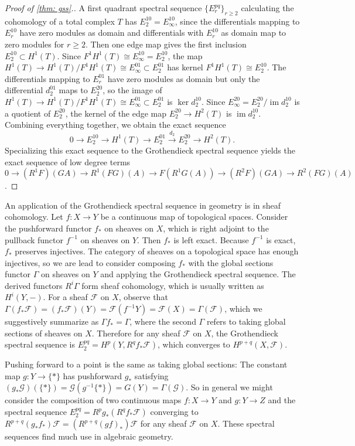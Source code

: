 \documentclass[11pt,leqno]{article}
\theoremstyle{plain}
\theoremstyle{definition}
\numberwithin{equation}{section}
\numberwithin{lem}{section}
\DeclareMathOperator{\im}{im}
\begin{document}
\begin{proof}[Proof of \cref{thm: gss}.]
  A first quadrant spectral sequence $\{E_r^{pq}\}_{r\geq 2}$ calculating the cohomology of a total complex $T$ has $E_2^{10} = E_\infty^{10}$, since the differentials mapping to $E_r^{10}$ have zero modules as domain and differentials with $E_r^{10}$ as domain map to zero modules for $r\geq 2$. Then one edge map gives the first inclusion $E_2^{10}\subset H^1(T)$. Since $F^1H^1(T)\cong E_\infty^{10} = E_2^{10}$, the map $H^1(T)\to H^1(T)/F^1H^1(T)\cong E_\infty^{01}\subset E_2^{01}$ has kernel $F^1H^1(T) \cong E_2^{10}$. The differentials mapping to $E_r^{01}$ have zero modules as domain but only the differential $d_2^{01}$ maps to $E_2^{20}$, so the image of $H^1(T)\to H^1(T)/F^1H^1(T)\cong E_\infty^{01}\subset E_2^{01}$ is $\ker d_2^{10}$. Since $E_\infty^{20} = E_2^{20}/\im d_2^{10}$ is a quotient of $E_2^{20}$, the kernel of the edge map $E_2^{20}\to H^2(T)$ is $\im d_2^{10}$. Combining everything together, we obtain the exact sequence 
  \[0\to E_2^{10}\to H^1(T)\to E_2^{01}\xrightarrow{d_2}E_2^{20}\to H^2(T).\]
  Specializing this exact sequence to the Grothendieck spectral sequence yields the exact sequence of low degree terms $0\to (R^1F)(GA)\to R^1(FG)(A)\to F(R^1G(A))\to (R^2F)(GA)\to R^2(FG)(A)$.
\end{proof} 

An application of the Grothendieck spectral sequence in geometry is in sheaf cohomology. Let $f\colon X\to Y$ be a continuous map of topological spaces. Consider the pushforward functor $f_\ast$ on sheaves on $X$, which is right adjoint to the pullback functor $f^{-1}$ on sheaves on $Y$. Then $f_\ast$ is left exact. Because $f^{-1}$ is exact, $f_\ast$ preserves injectives. The category of sheaves on a topological space has enough injectives, so we are lead to consider composing $f_\ast$ with the global sections functor $\Gamma$ on sheaves on $Y$ and applying the Grothendieck spectral sequence. The derived functors $R^i\Gamma$ form sheaf cohomology, which is usually written as $H^i(Y,-)$. For a sheaf $\mathcal F$ on $X$, observe that $\Gamma(f_\ast \mathcal F) = (f_\ast\mathcal F)(Y) = \mathcal F(f^{-1}Y) = \mathcal F(X) = \Gamma(\mathcal F)$, which we suggestively summarize as $\Gamma f_\ast = \Gamma$, where the second $\Gamma$ refers to taking global sections of sheaves on $X$. Therefore for any sheaf $\mathcal F$ on $X$, the Grothendieck spectral sequence is $E_2^{pq} = H^p(Y,R^qf_\ast \mathcal F)$, which converges to $H^{p+q}(X,\mathcal F)$.

Pushing forward to a point is the same as taking global sections: The constant map $g\colon Y\to \{\ast\}$ has pushforward $g_\ast$ satisfying $(g_\ast \mathcal G)(\{\ast\}) = \mathcal G(g^{-1}\{\ast\}) = G(Y) = \Gamma(\mathcal G)$. So in general we might consider the composition of two continuous maps $f\colon X\to Y$ and $g\colon Y\to Z$ and the spectral sequence $E_2^{pq} = R^pg_\ast(R^qf_\ast\mathcal F)$ converging to $R^{p+q}(g_\ast f_\ast)\mathcal F = (R^{p+q}(gf)_\ast)\mathcal F$ for any sheaf $\mathcal F$ on $X$. These spectral sequences find much use in algebraic geometry.
\end{document}
